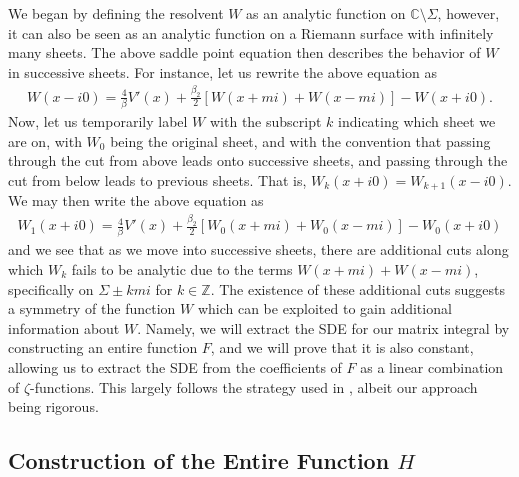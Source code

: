 \documentclass[10pt]{article}
\newcommand{\cc}{\mathbb{C}}
\newcommand{\zz}{\mathbb{Z}}
\theoremstyle{plain}
\theoremstyle{definition}
\theoremstyle{plain}
\begin{document}
We began by defining the resolvent $W$ as an analytic function on $\cc\setminus\Sigma$, however, it can also be seen as an analytic function on a Riemann surface with infinitely many sheets. The above saddle point equation then describes the behavior of $W$ in successive sheets. For instance, let us rewrite the above equation as 
\begin{align*}
	W(x-i0) = \frac{4}{\beta}V'(x)+\frac{\beta_2}{2}[W(x+mi)+W(x-mi)]-W(x+i0).
\end{align*}
Now, let us temporarily label $W$ with the subscript $k$ indicating which sheet we are on, with $W_0$ being the original sheet, and with the convention that passing through the cut from above leads onto successive sheets, and passing through the cut from below leads to previous sheets. That is, $W_k(x+i0)=W_{k+1}(x-i0)$. We may then write the above equation as
\begin{align*}
	W_1(x+i0) = \frac{4}{\beta}V'(x)+\frac{\beta_2}{2}[W_0(x+mi)+W_0(x-mi)]-W_0(x+i0)
\end{align*}
and we see that as we move into successive sheets, there are additional cuts along which $W_k$ fails to be analytic due to the terms $W(x+mi)+W(x-mi)$, specifically on $\Sigma \pm kmi$ for $k\in \zz$. The existence of these additional cuts suggests a symmetry of the function $W$ which can be exploited to gain additional information about $W$. Namely, we will extract the SDE for our matrix integral by constructing an entire function $F$, and we will prove that it is also constant, allowing us to extract the SDE from the coefficients of $F$ as a linear combination of $\zeta$-functions. This largely follows the strategy used in \cite{eynard1998iterative}, albeit our approach being rigorous.

\subsection{Construction of the Entire Function $H$}
\end{document}
